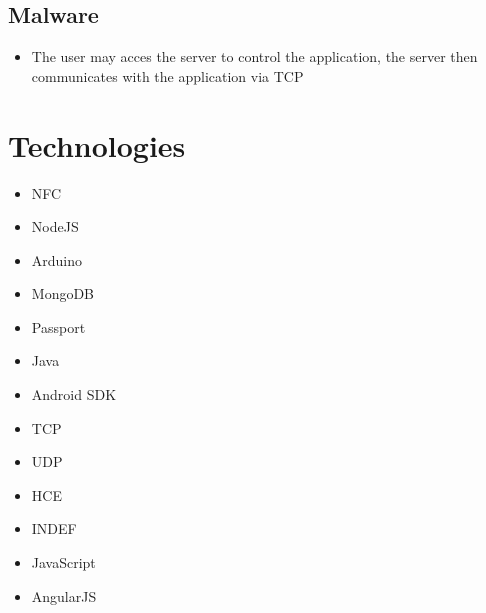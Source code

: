 \documentclass[a4paper,12pt,titlepage]{article}
\begin{document}
\subsection{Malware}
	\begin{itemize}
		\item The user may acces the server to control the application, the server then communicates with the application via TCP
	\end{itemize}
\newpage	\section{Technologies}
\begin{itemize}
\item NFC
\item NodeJS
\item Arduino
\item MongoDB
\item Passport
\item Java
\item Android SDK
\item TCP
\item UDP
\item HCE
\item INDEF
\item JavaScript
\item AngularJS
\end{itemize}
\end{document}
